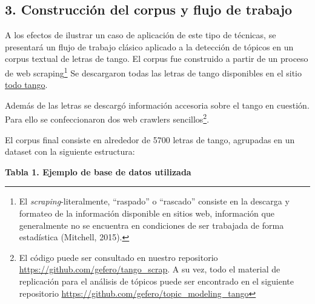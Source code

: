 \documentclass[]{article}
\let\rmarkdownfootnote\footnote%
\def\footnote{\protect\rmarkdownfootnote}
\begin{document}
\subsection{3. Construcción del corpus y flujo de
trabajo}\label{construcciuxf3n-del-corpus-y-flujo-de-trabajo}

A los efectos de ilustrar un caso de aplicación de este tipo de
técnicas, se presentará un flujo de trabajo clásico aplicado a la
detección de tópicos en un corpus textual de letras de tango. El corpus
fue construido a partir de un proceso de web scraping\footnote{El
  \emph{scraping}-literalmente, ``raspado'' o ``rascado'' consiste en la
  descarga y formateo de la información disponible en sitios web,
  información que generalmente no se encuentra en condiciones de ser
  trabajada de forma estadística (Mitchell, 2015).} Se descargaron todas
las letras de tango disponibles en el sitio
\href{www.todotango.com}{todo tango}.

Además de las letras se descargó información accesoria sobre el tango en
cuestión. Para ello se confeccionaron dos web crawlers
sencillos\footnote{El código puede ser consultado en nuestro repositorio
  \url{https://github.com/gefero/tango_scrap}. A su vez, todo el
  material de replicación para el análisis de tópicos puede ser
  encontrado en el siguiente repositorio
  \url{https://github.com/gefero/topic_modeling_tango}}.

El corpus final consiste en alrededor de 5700 letras de tango, agrupadas
en un dataset con la siguiente estructura:

\textbf{Tabla 1. Ejemplo de base de datos utilizada}
\end{document}
